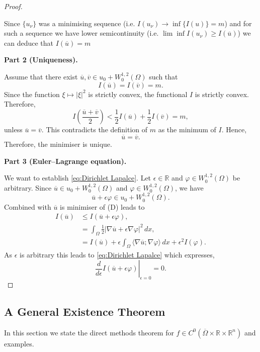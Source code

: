 \begin{proof}
\begin{enumerate}
        Since $\{u_\nu\}$ was a minimising sequence (i.e. $I(u_\nu) \rightarrow \inf\{I(u)\} =m$) and for such a sequence we have lower semicontinuity (i.e. $\lim \inf I(u_\nu) \ge I(\overline{u})$) we can deduce that $I(\overline{u}) =m$
    \end{enumerate}

    \noindent\textbf{Part 2 (Uniqueness).}
    
    Assume that there exist $\overline{u},\overline{v}\in u_0+W_0^{1,2}(\Omega)$ such that
    $$
        I(\overline{u})=I(\overline{v})=m.
    $$ 
    Since the function $\xi\mapsto|\xi|^2$ is strictly convex, the functional $I$ is strictly convex. Therefore,
    $$
        I\left(\frac{\overline{u}+\overline{v}}{2}\right)
        <
        \frac{1}{2}I(\overline{u})+\frac{1}{2}I(\overline{v})
        =m,
    $$
    unless $\overline{u}=\overline{v}$. This contradicts the definition of $m$ as the minimum of $I$. Hence,
    $$
        \overline{u}=\overline{v}.
    $$
    Therefore, the minimiser is unique.

    \noindent \textbf{Part 3 (Euler--Lagrange equation).}
    
We want to establish \eqref{eq:Dirichlet Lapalce}. Let $\epsilon\in\mathbb{R}$ and $\varphi\in W_0^{1,2}(\Omega)$ be arbitrary. Since $\overline{u}\in u_0+W_0^{1,2}(\Omega)$ and $\varphi\in W_0^{1,2}(\Omega)$, we have
$$
    \overline{u}+\epsilon\varphi
    \in u_0+W_0^{1,2}(\Omega).
$$ 
Combined with $\overline{u}$ is minimiser of (D) leads to
    $$
    \begin{aligned}
    I(\overline{u}) &\le I(\overline{u} +\epsilon\varphi),\\
    &= \int_{\Omega} \frac{1}{2}|\nabla\overline{u} +\epsilon\nabla\varphi|^2 \, dx,\\
    &= I(\overline{u}) + \epsilon \int_{\Omega} \langle \nabla\overline{u};\nabla\varphi \rangle \, dx + \epsilon^2I(\varphi).
    \end{aligned}
    $$
    As $\epsilon$ is arbitrary this leads to \eqref{eq:Dirichlet Lapalce} which expresses, 
    $$
    \left.\frac{d}{d\epsilon}I(\overline{u}+\epsilon\varphi)\right|_{\epsilon = 0} =0.
    $$
\end{proof}

\subsection{A General Existence Theorem}

In this section we state the direct methods theorem for $f \in C^0(\overline{\Omega} \times \mathbb{R} \times \mathbb{R}^n)$ and examples.

